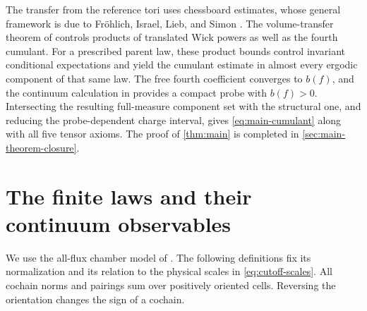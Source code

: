 The transfer from the reference tori uses chessboard estimates,
whose general framework is due to Fr\"ohlich, Israel, Lieb, and
Simon \cite{FILS1978}. The volume-transfer theorem of
\cite{VolumeTransfer} controls products of translated Wick
powers as well as the fourth cumulant. For a prescribed parent law,
these product bounds control invariant conditional expectations
and yield the cumulant estimate in almost every ergodic component
of that same law. The free fourth coefficient converges to $b(f)$,
and the continuum calculation in \cite{PositiveProbe} provides a
compact probe with $b(f)>0$. Intersecting the resulting full-measure
component set with the structural one, and reducing the
probe-dependent charge interval, gives \eqref{eq:main-cumulant}
along with all five tensor axioms.
The proof of \cref{thm:main} is completed in
\cref{sec:main-theorem-closure}.
\section{The finite laws and their continuum observables}\label{sec:regularization}

We use the all-flux chamber model of \cite[Section~2]{ChamberLattice}.
The following definitions fix its normalization and its relation to the
physical scales in \eqref{eq:cutoff-scales}. All cochain norms and
pairings sum over positively oriented cells. Reversing the orientation
changes the sign of a cochain.

